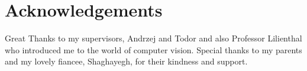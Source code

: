 \cleardoublepage
{}
{}
\chapter*{Acknowledgements}

Great Thanks to my supervisors, Andrzej and Todor and also Professor Lilienthal who introduced me to the world of computer vision.
Special thanks to my parents and my lovely fiancee, Shaghayegh, for their kindness and support.  